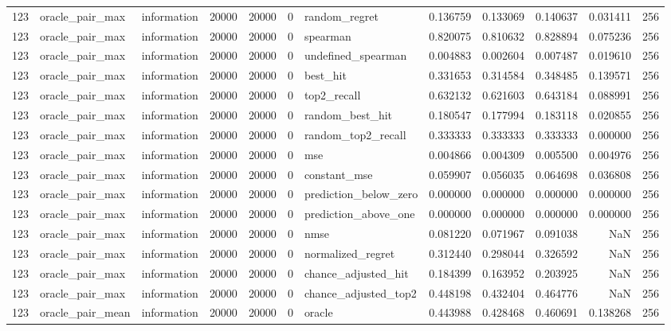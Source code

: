 \begin{tabular}{rllrrrlrrrrr}
123 & oracle_pair_max & information & 20000 & 20000 & 0 & random_regret & 0.136759 & 0.133069 & 0.140637 & 0.031411 & 256 \\
123 & oracle_pair_max & information & 20000 & 20000 & 0 & spearman & 0.820075 & 0.810632 & 0.828894 & 0.075236 & 256 \\
123 & oracle_pair_max & information & 20000 & 20000 & 0 & undefined_spearman & 0.004883 & 0.002604 & 0.007487 & 0.019610 & 256 \\
123 & oracle_pair_max & information & 20000 & 20000 & 0 & best_hit & 0.331653 & 0.314584 & 0.348485 & 0.139571 & 256 \\
123 & oracle_pair_max & information & 20000 & 20000 & 0 & top2_recall & 0.632132 & 0.621603 & 0.643184 & 0.088991 & 256 \\
123 & oracle_pair_max & information & 20000 & 20000 & 0 & random_best_hit & 0.180547 & 0.177994 & 0.183118 & 0.020855 & 256 \\
123 & oracle_pair_max & information & 20000 & 20000 & 0 & random_top2_recall & 0.333333 & 0.333333 & 0.333333 & 0.000000 & 256 \\
123 & oracle_pair_max & information & 20000 & 20000 & 0 & mse & 0.004866 & 0.004309 & 0.005500 & 0.004976 & 256 \\
123 & oracle_pair_max & information & 20000 & 20000 & 0 & constant_mse & 0.059907 & 0.056035 & 0.064698 & 0.036808 & 256 \\
123 & oracle_pair_max & information & 20000 & 20000 & 0 & prediction_below_zero & 0.000000 & 0.000000 & 0.000000 & 0.000000 & 256 \\
123 & oracle_pair_max & information & 20000 & 20000 & 0 & prediction_above_one & 0.000000 & 0.000000 & 0.000000 & 0.000000 & 256 \\
123 & oracle_pair_max & information & 20000 & 20000 & 0 & nmse & 0.081220 & 0.071967 & 0.091038 & NaN & 256 \\
123 & oracle_pair_max & information & 20000 & 20000 & 0 & normalized_regret & 0.312440 & 0.298044 & 0.326592 & NaN & 256 \\
123 & oracle_pair_max & information & 20000 & 20000 & 0 & chance_adjusted_hit & 0.184399 & 0.163952 & 0.203925 & NaN & 256 \\
123 & oracle_pair_max & information & 20000 & 20000 & 0 & chance_adjusted_top2 & 0.448198 & 0.432404 & 0.464776 & NaN & 256 \\
123 & oracle_pair_mean & information & 20000 & 20000 & 0 & oracle & 0.443988 & 0.428468 & 0.460691 & 0.138268 & 256 \\

\end{tabular}
